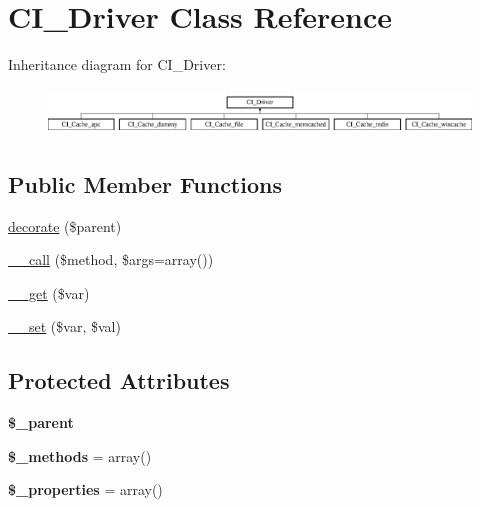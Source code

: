 \hypertarget{class_c_i___driver}{}\section{C\+I\+\_\+\+Driver Class Reference}
\label{class_c_i___driver}
Inheritance diagram for C\+I\+\_\+\+Driver\+:\begin{figure}[H]
\begin{center}
\leavevmode
\includegraphics[height=1.244444cm]{class_c_i___driver}
\end{center}
\end{figure}
\subsection*{Public Member Functions}
\begin{DoxyCompactItemize}
\item 
\mbox{\hyperlink{class_c_i___driver_a70860cdaec57d11aab77c18dd3212c94}{decorate}} (\$parent)
\item 
\mbox{\hyperlink{class_c_i___driver_a480efce8b312c1f295525f961f532cc1}{\+\_\+\+\_\+call}} (\$method, \$args=array())
\item 
\mbox{\hyperlink{class_c_i___driver_af77f8c79a6ce39b77af925a99d255b64}{\+\_\+\+\_\+get}} (\$var)
\item 
\mbox{\hyperlink{class_c_i___driver_a1f7d30797f4b11006ac015952e259910}{\+\_\+\+\_\+set}} (\$var, \$val)
\end{DoxyCompactItemize}
\subsection*{Protected Attributes}
\begin{DoxyCompactItemize}
\item 
\mbox{\label{class_c_i___driver_a9e55de7308ef2caa2e0245d1bf99c06e}} 
{\bfseries \$\+\_\+parent}
\item 
\mbox{\label{class_c_i___driver_af12fe064b9a6f01951646bbf43a906ce}} 
{\bfseries \$\+\_\+methods} = array()
\item 
\mbox{\label{class_c_i___driver_a4a35a726c8c499568638ff438554d9ec}} 
{\bfseries \$\+\_\+properties} = array()
\end{DoxyCompactItemize}
